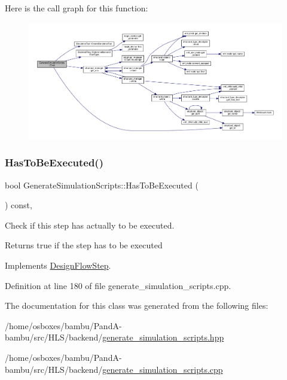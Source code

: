 Here is the call graph for this function\+:
\nopagebreak
\begin{figure}[H]
\begin{center}
\leavevmode
\includegraphics[width=350pt]{d4/d1b/classGenerateSimulationScripts_a58904865494c7a37559bb0490f5ee3a6_cgraph}
\end{center}
\end{figure}
\mbox{\label{classGenerateSimulationScripts_ab03643b6186e247c72faeb97f3e96e7b}} 
\subsubsection{\texorpdfstring{Has\+To\+Be\+Executed()}{HasToBeExecuted()}}
{\footnotesize\ttfamily bool Generate\+Simulation\+Scripts\+::\+Has\+To\+Be\+Executed (\begin{DoxyParamCaption}{ }\end{DoxyParamCaption}) const\hspace{0.3cm}{\ttfamily [override]}, {\ttfamily [virtual]}}



Check if this step has actually to be executed. 

\begin{DoxyReturn}{Returns}
true if the step has to be executed 
\end{DoxyReturn}


Implements \hyperlink{classDesignFlowStep_a1783abe0c1d162a52da1e413d5d1ef05}{Design\+Flow\+Step}.



Definition at line 180 of file generate\+\_\+simulation\+\_\+scripts.\+cpp.



The documentation for this class was generated from the following files\+:\begin{DoxyCompactItemize}
\item 
/home/osboxes/bambu/\+Pand\+A-\/bambu/src/\+H\+L\+S/backend/\hyperlink{generate__simulation__scripts_8hpp}{generate\+\_\+simulation\+\_\+scripts.\+hpp}\item 
/home/osboxes/bambu/\+Pand\+A-\/bambu/src/\+H\+L\+S/backend/\hyperlink{generate__simulation__scripts_8cpp}{generate\+\_\+simulation\+\_\+scripts.\+cpp}\end{DoxyCompactItemize}
